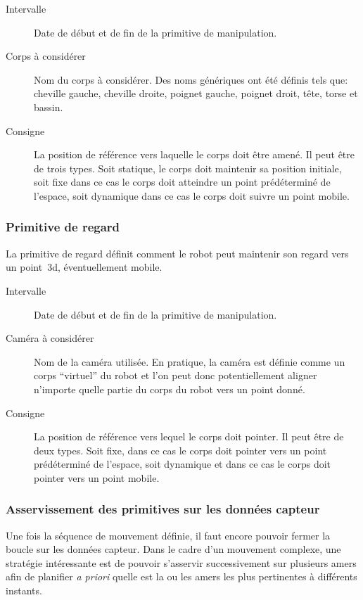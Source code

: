\begin{description}
\item[Intervalle] Date de début et de fin de la primitive de manipulation.
\item[Corps à considérer] Nom du corps à considérer. Des noms
  génériques ont été définis tels que: cheville gauche, cheville
  droite, poignet gauche, poignet droit, tête, torse et bassin.
\item[Consigne] La position de référence vers laquelle le corps doit
  être amené. Il peut être de trois types. Soit statique, le corps
  doit maintenir sa position initiale, soit fixe dans ce cas le corps
  doit atteindre un point prédéterminé de l'espace, soit dynamique
  dans ce cas le corps doit suivre un point mobile.
\end{description}


\subsubsection{Primitive de regard}

La primitive de regard définit comment le robot peut maintenir son
regard vers un point 3d, éventuellement mobile.

\begin{description}
\item[Intervalle] Date de début et de fin de la primitive de manipulation.
\item[Caméra à considérer] Nom de la caméra utilisée. En pratique, la
  caméra est définie comme un corps ``virtuel'' du robot et l'on peut
  donc potentiellement aligner n'importe quelle partie du corps du
  robot vers un point donné.
\item[Consigne] La position de référence vers lequel le corps doit
  pointer. Il peut être de deux types. Soit fixe, dans ce cas le corps
  doit pointer vers un point prédéterminé de l'espace, soit dynamique
  et dans ce cas le corps doit pointer vers un point mobile.
\end{description}


\subsubsection{Asservissement des primitives sur les données capteur}


Une fois la séquence de mouvement définie, il faut encore pouvoir
fermer la boucle sur les données capteur. Dans le cadre d'un mouvement
complexe, une stratégie intéressante est de pouvoir s'asservir
successivement sur plusieurs amers afin de planifier \emph{a priori}
quelle est la ou les amers les plus pertinentes à différents instants.


